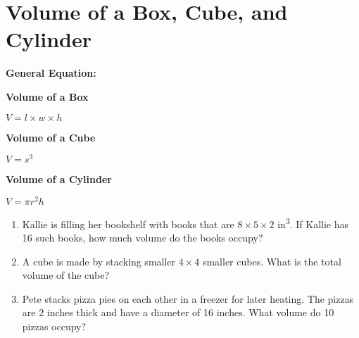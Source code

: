 \section[Volumes]{Volume of a Box, Cube, and Cylinder}

\textbf{General Equation:}

\begin{center}
\setlength{\columnseprule}{0pt}
\begin{multicols}{3}
\textbf{Volume of a Box}

$V=l\times w\times h$

\textbf{Volume of a Cube}

$V=s^3$

\textbf{Volume of a Cylinder}

$V=\pi r^2h$
\end{multicols}
\end{center}

\vfill
\begin{enumerate}[labelindent=*,style=multiline,leftmargin=*,label=\textbf{Example \arabic*:}]
\item Kallie is filling her bookshelf with books that are $8\times5\times2$ in\textsuperscript{3}. If Kallie has 16 such books, how much volume do the books occupy?

\vfill\item A cube is made by stacking smaller $4\times4$ smaller cubes. What is the total volume of the cube?

\vfill\item Pete stacks pizza pies on each other in a freezer for later heating. The pizzas are 2 inches thick and have a diameter of 16 inches. What volume do 10 pizzas occupy?
\end{enumerate}

